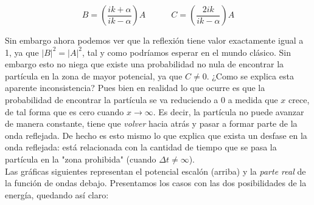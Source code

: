 \documentclass[12pt]{article}
\newcommand{\parentesis}[1]{\left( #1  \right)}
\newcommand{\tquad}{\quad \quad \quad}
\begin{document}
\begin{equation}
B = \parentesis{\dfrac{ik+\alpha}{ik-\alpha}} A \tquad C = \parentesis{\dfrac{2ik}{ik-\alpha}} A
\end{equation}

Sin embargo ahora podemos ver que la reflexión tiene valor exactamente igual a 1, ya que $|B|^2 = |A|^2$, tal y como podríamos esperar en el mundo clásico. Sin embargo esto no niega que existe una probabilidad no nula de encontrar la partícula en la zona de mayor potencial, ya que $C \neq 0$. ¿Como se explica esta aparente inconsistencia? Pues bien en realidad lo que ocurre es que la probabilidad de encontrar la partícula se va reduciendo a 0 a medida que $x$ crece, de tal forma que es cero cuando $x \rightarrow \infty$. Es decir, la partícula no puede avanzar de manera constante, tiene que \textit{volver} hacia atrás y pasar a formar parte de la onda reflejada. De hecho es esto mismo lo que explica que exista un desfase en la onda reflejada: está relacionada con la cantidad de tiempo que se pasa la partícula en la "zona prohibida" (cuando $\Delta t \neq \infty$). \\

Las gráficas siguientes representan el potencial escalón (arriba) y la \textit{parte real} de la función de ondas debajo. Presentamos los casos con las dos posibilidades de la energía, quedando así claro:
\end{document}
